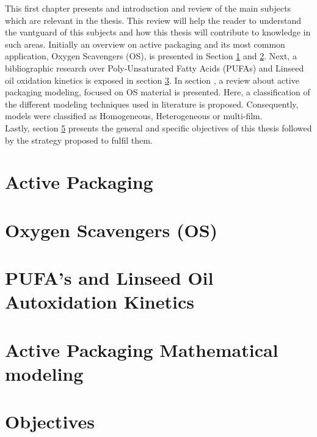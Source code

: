 \pagestyle{fancy}
This first chapter presents and introduction and review of the main subjects which are relevant in the thesis. This review will help the reader to understand the vantguard of this subjects and how this thesis will contribute to knowledge in such areas. Initially   an overview on active packaging and its most common application, Oxygen Scavengers (OS), is presented in Section \ref{sec:act_pac} and \ref{sec:OS}. Next, a bibliographic research over Poly-Unsaturated Fatty Acids (PUFAs) and Linseed oil oxidation kinetics is exposed in section \ref{sec:Linseed_Oxid.}. In section \label{sec:modeling}, a review about active packaging modeling, focused on OS material is presented. Here, a classification of the different modeling techniques used in literature is proposed. Consequently, models were classified as Homogeneous, Heterogeneous or multi-film.\\
Lastly, section \ref{sec:objectives} presents the general and specific objectives of this thesis followed by the strategy proposed to fulfil them. 

\section{Active Packaging}\label{sec:act_pac}








\section{Oxygen Scavengers (OS)}\label{sec:OS}

\section{PUFA's and Linseed Oil Autoxidation Kinetics}\label{sec:Linseed_Oxid.}

\section{Active Packaging Mathematical modeling}\label{sec:modeling}

\section{Objectives}\label{sec:objectives}


